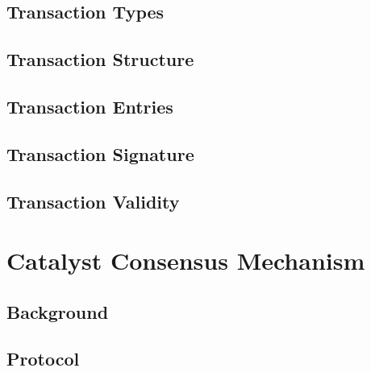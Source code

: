 \documentclass[a4paper, 12pt]{book}
\begin{document}



\section{Transaction Types} \label{Sec:Typ}



\section{Transaction Structure} \label{Sec:TStru}




\section{Transaction Entries}\label{Sec:TEnt}



\section{Transaction Signature}\label{Sec:Sig}




\section{Transaction Validity} \label{Sec:Val}





\chapter{Catalyst Consensus Mechanism} \label{Cha:CM}





\section{Background}\label{Sec:Cbg}



\section{Protocol}\label{Sec:Dem}
\end{document}
